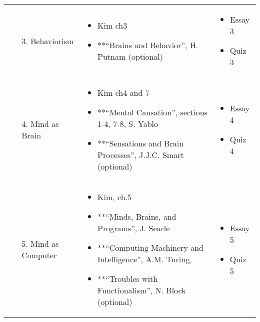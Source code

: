 \documentclass[article,oneside]{memoir}
\begin{document}
\begin{centering}
\begin{tabular}{| p{4cm} | p{7cm} | p{3cm} |}
\begin{enumerate} \item[3.] Behaviorism \end{enumerate}
&\begin{itemize} \item Kim ch3  \item **``Brains and Behavior'', H. Putnam (optional) \end{itemize}   
& \begin{itemize}  \item Essay 3 \item Quiz 3 \end{itemize} \\ 

\begin{enumerate} \item[4.] Mind as Brain \end{enumerate}
&\begin{itemize} \item Kim ch4 and 7  \item **``Mental Causation'', sections 1-4, 7-8, S. Yablo
\item **``Sensations and Brain Processes'', J.J.C. Smart (optional) \end{itemize}   
& \begin{itemize}  \item Essay 4 \item Quiz 4 \end{itemize} \\ 

\begin{enumerate} \item[5.] Mind as Computer  \end{enumerate}
&\begin{itemize} \item Kim, ch.5
\item**``Minds, Brains, and Programs'', J.  Searle
\item **``Computing Machinery and Intelligence'', A.M. Turing, 
\item **``Troubles with Functionalism'', N. Block (optional) \end{itemize}   
& \begin{itemize}  \item Essay 5 \item Quiz 5 \end{itemize} \\  


\end{tabular}
\end{centering}
\end{document}
